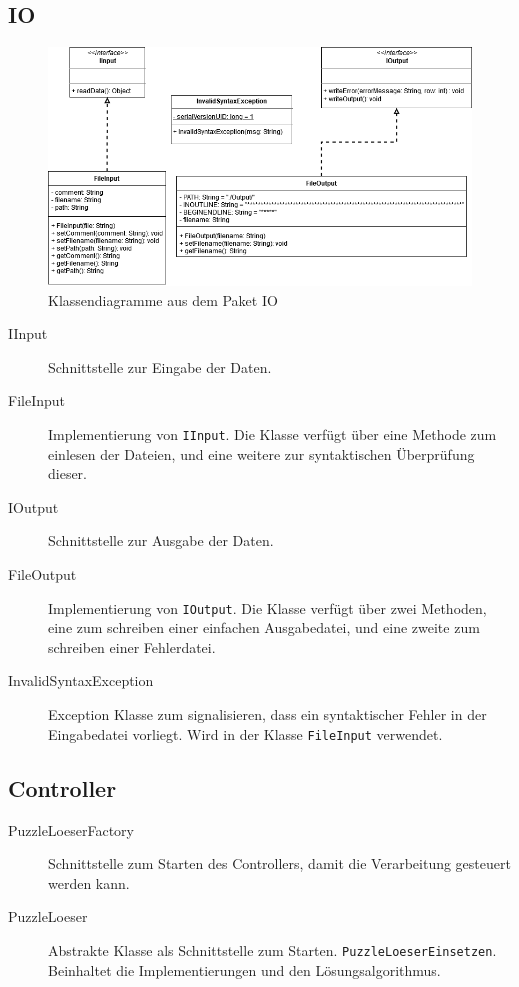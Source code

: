 \subsection{IO}
\begin{figure}[!h]
	\centering
	\includegraphics[width=\textwidth]{./../Diagramme/IO-Classdiagram.png}
	\caption{Klassendiagramme aus dem Paket IO}
\end{figure}
\begin{description}
	\item [IInput] Schnittstelle zur Eingabe der Daten.
	\item [FileInput] Implementierung von \lstinline{IInput}. Die Klasse verfügt über eine Methode zum einlesen der Dateien, und eine weitere zur syntaktischen Überprüfung dieser.
	\item [IOutput] Schnittstelle zur Ausgabe der Daten.
	\item [FileOutput] Implementierung von \lstinline{IOutput}. Die Klasse verfügt über zwei Methoden, eine zum schreiben einer einfachen Ausgabedatei, und eine zweite zum schreiben einer Fehlerdatei.
	\item [InvalidSyntaxException] Exception Klasse zum signalisieren, dass ein syntaktischer Fehler in der Eingabedatei vorliegt. Wird in der Klasse \lstinline{FileInput} verwendet.
\end{description}

\subsection{Controller}
\begin{description}
	\item [PuzzleLoeserFactory] Schnittstelle zum Starten des Controllers, damit die Verarbeitung gesteuert werden kann.	\item [PuzzleLoeser] Abstrakte Klasse als Schnittstelle zum Starten. \lstinline{PuzzleLoeserEinsetzen}. Beinhaltet die Implementierungen und den Lösungsalgorithmus.
\end{description}

